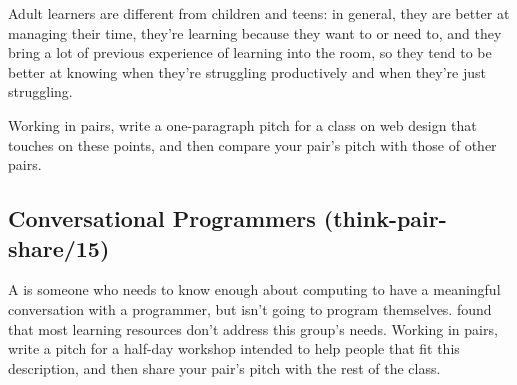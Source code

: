 Adult learners are different from children and teens: in general, they
are better at managing their time, they're learning because they want to
or need to, and they bring a lot of previous experience of learning into
the room, so they tend to be better at knowing when they're struggling
productively and when they're just struggling.

Working in pairs, write a one-paragraph pitch for a class on web design
that touches on these points, and then compare your pair's pitch with
those of other pairs.

\subsection*{Conversational Programmers (think-pair-share/15)}

A 
is someone who needs to know enough about computing to have a meaningful
conversation with a programmer, but isn't going to program themselves.
\cite{Wang2018} found that most learning resources don't address this
group's needs. Working in pairs, write a pitch for a half-day workshop
intended to help people that fit this description, and then share your
pair's pitch with the rest of the class.
